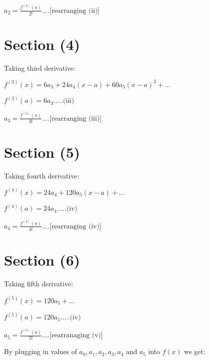 \documentclass[14pt]{extreport}
\begin{document}
$ a_2 = \frac{f^{(2)}(a)}{2!}....\text{[rearranging (ii)]}$
\newline
\newline


\section{Section (4)}

Taking third derivative:
\newline

$f^{(3)}(x) =  6a_3 + 24a_4(x-a) + 60a_5(x-a)^2 + ...$
\newline

$f^{(3)}(a) = 6a_3.....\text{(iii)}$
\newline

$a_3 = \frac{f^{(3)}(a)}{3!}....\text{[rearranging (iii)]}$
\newline
\newline



\section{Section (5)}

Taking fourth derivative:
\newline

$f^{(4)}(x) =  24a_4 + 120a_5(x-a) + ...$
\newline

$f^{(4)}(a) = 24a_4.....\text{(iv)}$
\newline

$a_4 = \frac{f^{(4)}(a)}{4!}....\text{[rearranging (iv)]}$
\newline
\newline


\section{Section (6)}
Taking fifth derivative:
\newline

$f^{(5)}(x) =  120a_5 + ...$
\newline

$f^{(5)}(a) = 120a_5.....\text{(iv)}$
\newline

$a_5 = \frac{f^{(5)}(a)}{5!}....\text{[rearranaging (v)]}$
\newline
\newline


By plugging in values of $a_{0}, a_{1}, a_{2}, a_{3}, a_{4} \text{ and } a_5$ into $f(x)$ we get:
\end{document}
